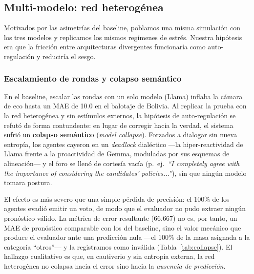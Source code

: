 \documentclass[11pt]{article}
\begin{document}
\subsection{Multi-modelo: red heterogénea}
\label{subsec:multimodelo}

Motivados por las asimetrías del baseline, poblamos una misma simulación con los tres modelos y replicamos los mismos regímenes de estrés. Nuestra hipótesis era que la fricción entre arquitecturas divergentes funcionaría como auto-regulación y reduciría el sesgo.

\subsubsection{Escalamiento de rondas y colapso semántico}

En el baseline, escalar las rondas con un solo modelo (Llama) inflaba la cámara de eco hasta un MAE de 10.0 en el balotaje de Bolivia. Al replicar la prueba con la red heterogénea y sin estímulos externos, la hipótesis de auto-regulación se refutó de forma contundente: en lugar de corregir hacia la verdad, el sistema sufrió un \textbf{colapso semántico} (\textit{model collapse}). Forzados a dialogar sin nueva entropía, los agentes cayeron en un \textit{deadlock} dialéctico —la hiper-reactividad de Llama frente a la proactividad de Gemma, moduladas por sus esquemas de alineación— y el foro se llenó de cortesía vacía (p.\ ej.\ \textit{``I completely agree with the importance of considering the candidates' policies...''}), sin que ningún modelo tomara postura.

El efecto es más severo que una simple pérdida de precisión: el 100\% de los agentes evadió emitir un voto, de modo que el evaluador no pudo extraer ningún pronóstico válido. La métrica de error resultante (66.667) no es, por tanto, un MAE de pronóstico comparable con los del baseline, sino el valor mecánico que produce el evaluador ante una predicción nula —el 100\% de la masa asignada a la categoría ``otros''— y la registramos como inválida (Tabla~\ref{tab:collapse}). El hallazgo cualitativo es que, en cautiverio y sin entropía externa, la red heterogénea no colapsa hacia el error sino hacia la \textit{ausencia de predicción}.
\end{document}
